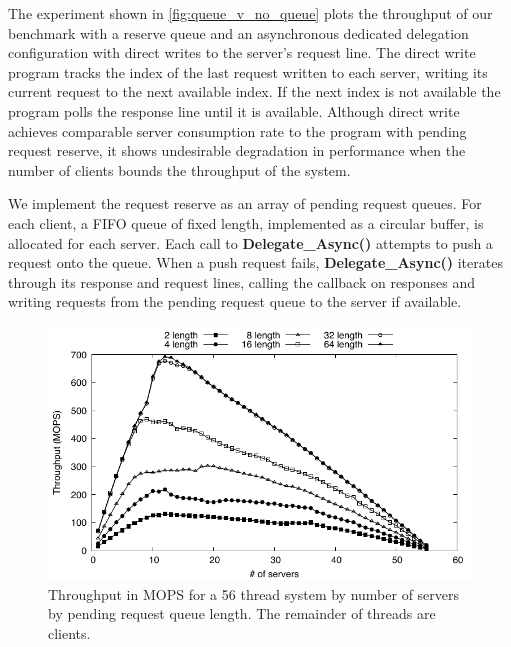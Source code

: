 \documentclass{uicthesi}
\begin{document}
The experiment shown in \ref{fig:queue_v_no_queue} plots the throughput of our benchmark with a reserve queue and an asynchronous dedicated delegation configuration with direct writes to the server's request line. The direct write program tracks the index of the last request written to each server, writing its current request to the next available index. If the next index is not available the program polls the response line until it is available. Although direct write achieves comparable server consumption rate to the program with pending request reserve, it shows undesirable degradation in performance when the number of clients bounds the throughput of the system. 

We implement the request reserve as an array of pending request queues. For each client, a FIFO queue of fixed length, implemented as a circular buffer, is allocated for each server. Each call to \textbf{Delegate\_Async()} attempts to push a request onto the queue. When a push request fails, \textbf{Delegate\_Async()} iterates through its response and request lines, calling the callback on responses and writing requests from the pending request queue to the server if available. 

\begin{figure}[ht!]
\centering
\includegraphics[width=0.9\columnwidth]{FIG/vary_queue_length.pdf}
\caption{Throughput in MOPS for a 56 thread system by number of servers by pending request queue length. The remainder of threads are clients.}
\label{fig:dedicated_vary_queue}
\end{figure}
\end{document}
